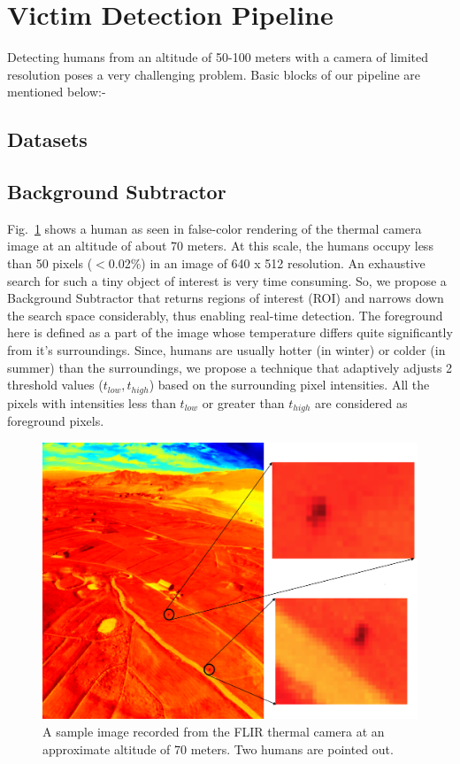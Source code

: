 \documentclass[runningheads]{llncs}
\begin{document}
\section{Victim Detection Pipeline}
Detecting humans from an altitude of 50-100 meters with a camera of limited resolution poses a very challenging problem. Basic blocks of our pipeline are mentioned below:-

\subsection{Datasets}

\subsection{Background Subtractor}
Fig.~\ref{fig:thermal_sample} shows a human as seen in false-color rendering of the thermal camera image at an altitude of about 70 meters. At this scale, the humans occupy less than 50 pixels ($<$0.02\%) in an image of 640 x 512 resolution. An exhaustive search for such a tiny object of interest is very time consuming. So, we propose a Background Subtractor that returns regions of interest (ROI) and narrows down the search space considerably, thus enabling real-time detection. The foreground here is defined as a part of the image whose temperature differs quite significantly from it's surroundings. Since, humans are usually hotter (in winter) or colder (in summer) than the surroundings, we propose a technique that adaptively adjusts 2 threshold values ($t_{low}, t_{high}$) based on the surrounding pixel intensities. All the pixels with intensities less than $t_{low}$ or greater than $t_{high}$ are considered as foreground pixels.

\begin{figure}
\centerline{\includegraphics[scale=0.3]{img/sample_thermal.png}}
\caption{A sample image recorded from the FLIR thermal camera at an approximate altitude of 70 meters. Two humans are pointed out.}
\label{fig:thermal_sample}
\end{figure}
\end{document}
